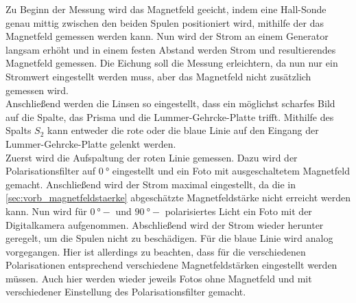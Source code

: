 Zu Beginn der Messung wird das Magnetfeld geeicht,
indem eine Hall-Sonde genau mittig zwischen den beiden Spulen positioniert wird,
mithilfe der das Magnetfeld gemessen werden kann.
Nun wird der Strom an einem Generator langsam erhöht und in einem festen Abstand werden Strom und resultierendes Magnetfeld gemessen.
Die Eichung soll die Messung erleichtern,
da nun nur ein Stromwert eingestellt werden muss,
aber das Magnetfeld nicht zusätzlich gemessen wird.\\
Anschließend werden die Linsen so eingestellt, 
dass ein möglichst scharfes Bild auf die Spalte, das Prisma und die Lummer-Gehrcke-Platte trifft.
Mithilfe des Spalts $S_2$ kann entweder die rote oder die blaue Linie auf den Eingang der Lummer-Gehrcke-Platte gelenkt werden.\\
Zuerst wird die Aufspaltung der roten Linie gemessen.
Dazu wird der Polarisationsfilter auf $\SI{0}{\degree}$ eingestellt und ein Foto mit ausgeschaltetem Magnetfeld gemacht.
Anschließend wird der Strom maximal eingestellt,
da die in \autoref{sec:vorb_magnetfeldstaerke} abgeschätzte Magnetfeldstärke nicht erreicht werden kann.
Nun wird für $\SI{0}{\degree}-$ und $\SI{90}{\degree}-$ polarisiertes Licht ein Foto mit der Digitalkamera aufgenommen.
Abschließend wird der Strom wieder herunter geregelt,
um die Spulen nicht zu beschädigen.
Für die blaue Linie wird analog vorgegangen.
Hier ist allerdings zu beachten,
dass für die verschiedenen Polarisationen entsprechend verschiedene Magnetfeldstärken eingestellt werden müssen.
Auch hier werden wieder jeweils Fotos ohne Magnetfeld und mit verschiedener Einstellung des Polarisationsfilter gemacht.